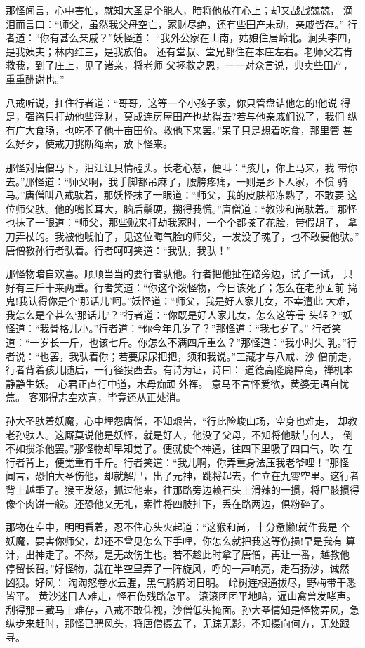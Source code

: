 那怪闻言，心中害怕，就知大圣是个能人，暗将他放在心上；却又战战兢兢，
滴泪而言曰：“师父，虽然我父母空亡，家财尽绝，还有些田产未动，亲戚皆存。”
行者道：“你有甚么亲戚？”妖怪道：
“我外公家在山南，姑娘住居岭北。涧头李四，是我姨夫；林内红三，是我族伯。
还有堂叔、堂兄都住在本庄左右。老师父若肯救我，到了庄上，见了诸亲，将老师
父拯救之恩，一一对众言说，典卖些田产，重重酬谢也。”

八戒听说，扛住行者道：“哥哥，这等一个小孩子家，你只管盘诘他怎的!他说
得是，强盗只打劫他些浮财，莫成连房屋田产也劫得去?若与他亲戚们说了，我们
纵有广大食肠，也吃不了他十亩田价。救他下来罢。”呆子只是想着吃食，那里管
甚么好歹，使戒刀挑断绳索，放下怪来。

那怪对唐僧马下，泪汪汪只情磕头。长老心慈，便叫：“孩儿，你上马来，我
带你去。”那怪道：“师父啊，我手脚都吊麻了，腰胯疼痛，一则是乡下人家，不惯
骑马。”唐僧叫八戒驮着，那妖怪抹了一眼道：“师父，我的皮肤都冻熟了，不敢要
这位师父驮。他的嘴长耳大，脑后鬃硬，搠得我慌。”唐僧道：“教沙和尚驮着。”
那怪也抹了一眼道：“师父，那些贼来打劫我家时，一个个都搽了花脸，带假胡子，
拿刀弄杖的。我被他唬怕了，见这位晦气脸的师父，一发没了魂了，也不敢要他驮。”
唐僧教孙行者驮着。行者呵呵笑道：“我驮，我驮！”

那怪物暗自欢喜。顺顺当当的要行者驮他。行者把他扯在路旁边，试了一试，
只好有三斤十来两重。行者笑道：“你这个泼怪物，今日该死了；怎么在老孙面前
捣鬼!我认得你是个‘那话儿’呵。”妖怪道：“师父，我是好人家儿女，不幸遭此
大难，我怎么是个甚么‘那话儿’？”行者道：“你既是好人家儿女，怎么这等骨
头轻？”妖怪道：“我骨格儿小。”行者道：“你今年几岁了？”那怪道：“我七岁了。”
行者笑道：“一岁长一斤，也该七斤。你怎么不满四斤重么？”那怪道：“我小时失
乳。”行者说：“也罢，我驮着你；若要尿尿把把，须和我说。”三藏才与八戒、沙
僧前走，行者背着孩儿随后，一行径投西去。有诗为证，诗曰：
道德高隆魔障高，禅机本静静生妖。
心君正直行中道，木母痴顽外裈。
意马不言怀爱欲，黄婆无语自忧焦。
客邪得志空欢喜，毕竟还从正处消。

孙大圣驮着妖魔，心中埋怨唐僧，不知艰苦，“行此险峻山场，空身也难走，
却教老孙驮人。这厮莫说他是妖怪，就是好人，他没了父母，不知将他驮与何人，
倒不如掼杀他罢。”那怪物却早知觉了。便就使个神通，往四下里吸了四口气，吹
在行者背上，便觉重有千斤。行者笑道：“我儿啊，你弄重身法压我老爷哩！”那怪
闻言，恐怕大圣伤他，却就解尸，出了元神，跳将起去，伫立在九霄空里。这行者
背上越重了。猴王发怒，抓过他来，往那路旁边赖石头上滑辣的一掼，将尸骸掼得
像个肉饼一般。还恐他又无礼，索性将四肢扯下，丢在路两边，俱粉碎了。

那物在空中，明明看着，忍不住心头火起道：“这猴和尚，十分惫懒!就作我是
个妖魔，要害你师父，却还不曾见怎么下手哩，你怎么就把我这等伤损!早是我有
算计，出神走了。不然，是无故伤生也。若不趁此时拿了唐僧，再让一番，越教他
停留长智。”好怪物，就在半空里弄了一阵旋风，呼的一声响亮，走石扬沙，诚然
凶狠。好风：
淘淘怒卷水云腥，黑气腾腾闭日明。
岭树连根通拔尽，野梅带干悉皆平。
黄沙迷目人难走，怪石伤残路怎平。
滚滚团团平地暗，遍山禽兽发哮声。
刮得那三藏马上难存，八戒不敢仰视，沙僧低头掩面。孙大圣情知是怪物弄风，急
纵步来赶时，那怪已骋风头，将唐僧摄去了，无踪无影，不知摄向何方，无处跟寻。

